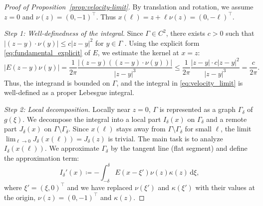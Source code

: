 \documentclass{article}
\theoremstyle{remark}
\theoremstyle{definition}
\numberwithin{equation}{section}
\begin{document}
\begin{proof}[Proof of Proposition~\ref{prop:velocity-limit}]
    By translation and rotation, we assume $z = 0$ and $\nu(z) = (0, -1)^\top$. Thus $x(\ell) = z + \ell \nu(z) = (0, -\ell)^\top$.

    \textit{Step 1: Well-definedness of the integral.}
    Since $\Gamma \in C^2$, there exists $c > 0$ such that $|(z- y) \cdot \nu(y)| \le c |z - y|^2$ for $y \in \Gamma$ \cite[Lemma~3.15, p.~124]{folland1995introduction}.
    Using the explicit form \eqref{eq:fundamental_explicit} of $E$, we estimate the kernel at $x=z$:
    \begin{equation*}
        |E(z - y) \nu(y)| = \frac{1}{2\pi} \frac{|(z - y) \left((z - y) \cdot \nu(y)\right)|}{|z - y|^3} 
        \le \frac{1}{2\pi} \frac{|z-y| \cdot c|z-y|^2}{|z-y|^3} = \frac{c}{2\pi}.
    \end{equation*}
    Thus, the integrand is bounded on $\Gamma$, and the integral in \eqref{eq:velocity_limit} is well-defined as a proper Lebesgue integral.

    \textit{Step 2: Local decomposition.}
    Locally near $z=0$, $\Gamma$ is represented as a graph $\Gamma_\delta$ of $g(\xi)$.
    We decompose the integral into a local part $I_\delta(x)$ on $\Gamma_\delta$ and a remote part $J_\delta(x)$ on $\Gamma \setminus \Gamma_\delta$.
    Since $x(\ell)$ stays away from $\Gamma \setminus \Gamma_\delta$ for small $\ell$, the limit $\lim_{\ell \to 0} J_\delta(x(\ell)) = J_\delta(z)$ is trivial.
    The main task is to analyze $I_\delta(x(\ell))$. We approximate $\Gamma_\delta$ by the tangent line (flat segment) and define the approximation term:
    \begin{equation*}
        I_\delta'(x) \coloneqq -\int_{-\delta}^\delta E(x - \xi') \nu(z) \kappa(z) \, \mathrm{d}\xi,
    \end{equation*}
    where $\xi'=(\xi, 0)^\top$ and we have replaced $\nu(\xi')$ and $\kappa(\xi')$ with their values at the origin, $\nu(z) = (0, -1)^\top$ and $\kappa(z)$.


\end{proof}
\end{document}
